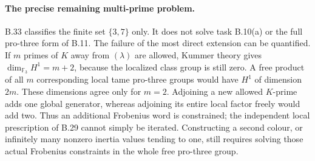 \paragraph{The precise remaining multi-prime problem.}
B.33 classifies the finite set $\{3,7\}$ only.
It does not solve task B.10(a) or the full pro-three
form of B.11.  The failure of the most direct extension
can be quantified.  If $m$ primes of $K$ away from
$(\lambda)$ are allowed, Kummer theory gives
$\dim_{\mathbb F_3}H^1=m+2$, because the localized
class group is still zero.  A free product of all
$m$ corresponding local tame pro-three groups would
have $H^1$ of dimension $2m$.
These dimensions agree only for $m=2$.
Adjoining a new allowed $K$-prime adds one global
generator, whereas adjoining its entire local factor
freely would add two.  Thus an additional Frobenius
word is constrained; the independent local
prescription of B.29 cannot simply be iterated.
Constructing a second colour, or infinitely many
nonzero inertia values tending to one, still requires
solving those actual Frobenius constraints in the
whole free pro-three group.

